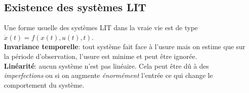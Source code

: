 \documentclass{report}
\begin{document}
\subsection{Existence des systèmes LIT}
Une forme usuelle des systèmes LIT dans la vraie vie est de type $\dot{x}(t) = f(x(t), u(t), t)$.\\
\textbf{Invariance temporelle}: tout système fait face à l'usure mais on estime que sur la période d'observation, l'usure est minime et peut être ignorée.\\
\textbf{Linéarité}: aucun système n'est pas linéaire. Cela peut être dû à des \textit{imperfections} ou si on augmente \textit{énormément} l'entrée ce qui change le comportement du système.\\
\end{document}
